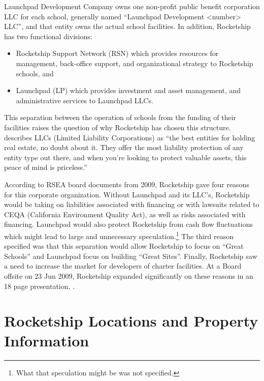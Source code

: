 Launchpad Development Company owns one non-profit public benefit corporation LLC for each school, generally named ``Launchpad Development <number> LLC'', and that entity owns the actual school facilities. In addition, Rocketship has two functional divisions:
\begin{itemize}
  \item Rocketship Support Network (RSN) which provides resources for management, back-office support, and organizational strategy to Rocketship schools, and
  \item Launchpad (LP) which provides investment and asset management, and administrative services to Launchpad LLCs.
\end{itemize}

This separation between the operation of schools from the funding of their facilities raises the question of why Rocketship has chosen this structure. \citeauthor{Reuting2023} describes LLCs (Limited Liability Corporations) as ``the best entities for holding real estate, no doubt about it. They offer the most liability protection of any entity type out there, and when you're looking to protect valuable assets, this peace of mind is priceless.'' \parencite[292]{Reuting2023}

According to RSEA board documents from 2009, Rocketship gave four reasons for this corporate organization. Without Launchpad and its LLC's, Rocketship would be taking on liabilities associated with financing or with lawsuits related to CEQA (California Environment Quality Act), as well as risks associated with financing. Launchpad would also protect Rocketship from cash flow fluctuations which might lead to large and unnecessary speculation.\footnote{What that speculation might be was not specified.} The third reason specified was that this separation would allow Rocketship to focus on ``Great Schools'' and Launchpad focus on building ``Great Sites''. Finally, Rocketship saw a need to increase the market for developers of charter facilities. At a Board offsite on 23 Jun 2009, Rocketship expanded significantly on these reasons in an 18 page presentation, \textcite{RSED2009b}.

\section{Rocketship Locations and Property Information}
\label{sec:location-and-property-info}\indent%

